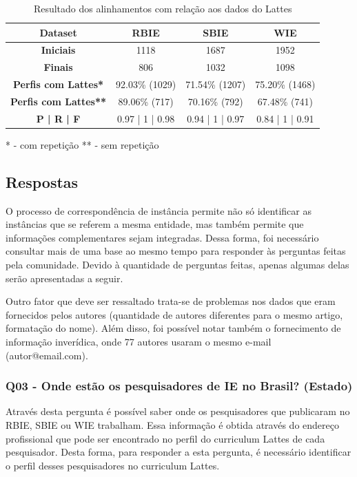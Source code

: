 \begin{table}[!ht]
	\centering
	\caption{ Resultado dos alinhamentos com relação aos dados do Lattes}
	\label{tab:case_study}
	\begin{tabular}{|c|c|c|c|}
		\hline
		\textbf{Dataset}	&	\textbf{RBIE}	&	\textbf{SBIE}	&	\textbf{WIE}  \\ \hline
		\textbf{Iniciais}	&	1118	&	1687	&	1952 \\ \hline
		\textbf{Finais}	&	806	&	1032	&	1098 \\ \hline
		\textbf{Perfis com Lattes*}	&	92.03\% (1029)	&	71.54\% (1207)	&	75.20\% (1468) \\ \hline
		\textbf{Perfis com Lattes**}	&	89.06\% (717)	&	70.16\% (792)	&	67.48\% (741) \\ \hline
		\textbf{P | R | F}	&	0.97 | 1 | 0.98	&	0.94 | 1 | 0.97 	&	0.84 | 1 | 0.91 \\ \hline
	\end{tabular}
\end{table}
* - com repetição
** - sem repetição

\subsection{Respostas}
O processo de correspondência de instância permite não só identificar as instâncias que se referem a mesma entidade, mas também permite que informações complementares sejam integradas. Dessa forma, foi necessário consultar mais de uma base ao mesmo tempo para responder às perguntas feitas pela comunidade. Devido à quantidade de perguntas feitas, apenas algumas delas serão apresentadas a seguir.

Outro fator que deve ser ressaltado trata-se de problemas nos dados que eram fornecidos pelos autores (quantidade de autores diferentes para o mesmo artigo, formatação do nome). Além disso, foi possível notar também o fornecimento de informação inverídica, onde 77 autores usaram o mesmo e-mail (autor@email.com).

\subsubsection{Q03 - Onde estão os pesquisadores de IE no Brasil? (Estado)}
Através desta pergunta é possível saber onde os pesquisadores que publicaram no RBIE, SBIE ou WIE trabalham. Essa informação é obtida através do endereço profissional que pode ser encontrado no perfil do curriculum Lattes de cada pesquisador. Desta forma, para responder a esta pergunta, é necessário identificar o perfil desses pesquisadores no curriculum Lattes.

